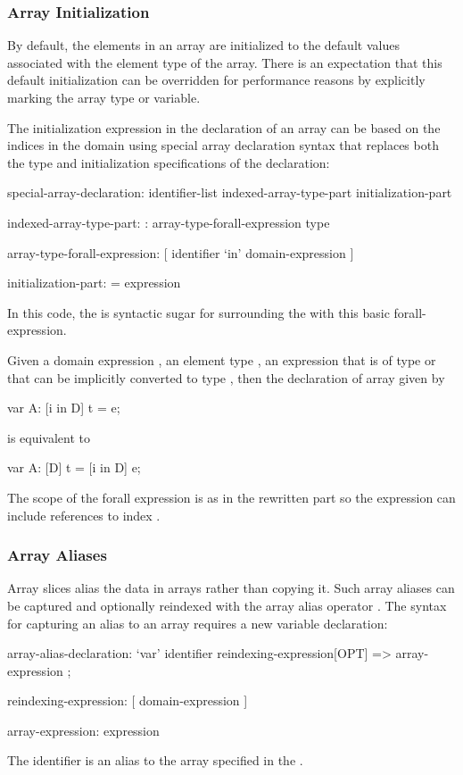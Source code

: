 \subsubsection{Array Initialization}
\label{Array_Initialization}

By default, the elements in an array are initialized to the default
values associated with the element type of the array.  There is an
expectation that this default initialization can be overridden for
performance reasons by explicitly marking the array type or variable.

The initialization expression in the declaration of an array can be
based on the indices in the domain using special array declaration
syntax that replaces both the type and initialization specifications
of the declaration:
\begin{syntax}
special-array-declaration:
  identifier-list indexed-array-type-part initialization-part

indexed-array-type-part:
  : array-type-forall-expression type

array-type-forall-expression:
  [ identifier `in' domain-expression ]

initialization-part:
  = expression
\end{syntax}
In this code, the  is syntactic
sugar for surrounding the  with this basic
forall-expression.

Given a domain expression , an element type , an
expression  that is of type  or that can be implicitly
converted to type , then the declaration of array 
given by
\begin{chapel}
var A: [i in D] t = e;
\end{chapel}
is equivalent to
\begin{chapel}
var A: [D] t = [i in D] e;
\end{chapel}
The scope of the forall expression is as in the rewritten part so the
expression  can include references to index .

\subsubsection{Array Aliases}
\label{Array_Aliases}

Array slices alias the data in arrays rather than copying it.  Such
array aliases can be captured and optionally reindexed with the array
alias operator \chpl{=>}.  The syntax for capturing an alias to an
array requires a new variable declaration:
\begin{syntax}
array-alias-declaration:
  `var' identifier reindexing-expression[OPT] => array-expression ;

reindexing-expression:
  [ domain-expression ]

array-expression:
  expression
\end{syntax}
The identifier is an alias to the array specified in
the .

